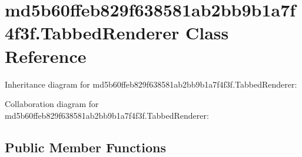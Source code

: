 \hypertarget{classmd5b60ffeb829f638581ab2bb9b1a7f4f3f_1_1_tabbed_renderer}{}\section{md5b60ffeb829f638581ab2bb9b1a7f4f3f.\+Tabbed\+Renderer Class Reference}
\label{classmd5b60ffeb829f638581ab2bb9b1a7f4f3f_1_1_tabbed_renderer}


Inheritance diagram for md5b60ffeb829f638581ab2bb9b1a7f4f3f.\+Tabbed\+Renderer\+:


Collaboration diagram for md5b60ffeb829f638581ab2bb9b1a7f4f3f.\+Tabbed\+Renderer\+:
\subsection*{Public Member Functions}
